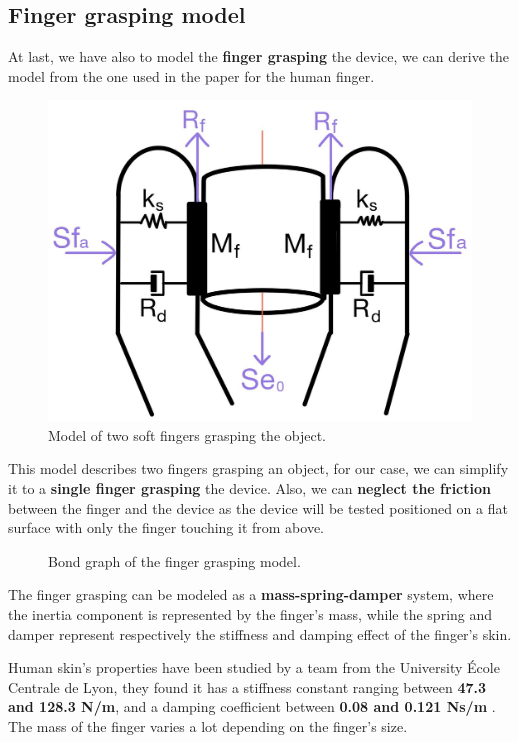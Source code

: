 \subsection{Finger grasping model}
\begin{samepage}
    At last, we have also to model the \textbf{finger grasping} the device, we can derive the model from the one used in the paper \cite{Finger_grasping_model} for the human finger.
    \nopagebreak

    \begin{figure}[H]
        \centering
        \includegraphics[width = 0.6\linewidth]{Chapters/Chapter2/Modelling_of_Entire_System/Figures/Model-of-two-soft-fingers-grasping-the-object.jpg}
        \caption{Model of two soft fingers grasping the object.}
        \label{fig: Finger_grasping_model}
    \end{figure}
\end{samepage}

This model describes two fingers grasping an object, for our case, we can simplify it to a \textbf{single finger grasping} the device.
Also, we can \textbf{neglect the friction} between the finger and the device as the device will be tested positioned on a flat surface with only the finger touching it from above.
\begin{figure}[H]
    \centering
    \resizebox{.7\linewidth}{!}{
        
    }
    \caption{Bond graph of the finger grasping model.}
    \label{fig: Finger_grasping_bond_graph}
\end{figure}

The finger grasping can be modeled as a \textbf{mass-spring-damper} system, where the inertia component is represented by the finger's mass, while the spring and damper represent respectively the stiffness and damping effect of the finger's skin.

Human skin's properties have been studied by a team from the University École Centrale de Lyon, they found it has a stiffness constant ranging between \textbf{47.3 and 128.3 N/m}, and a damping coefficient between \textbf{0.08 and 0.121 Ns/m} \cite{Mech_characteristics_of_human_skin}.
The mass of the finger varies a lot depending on the finger's size.
